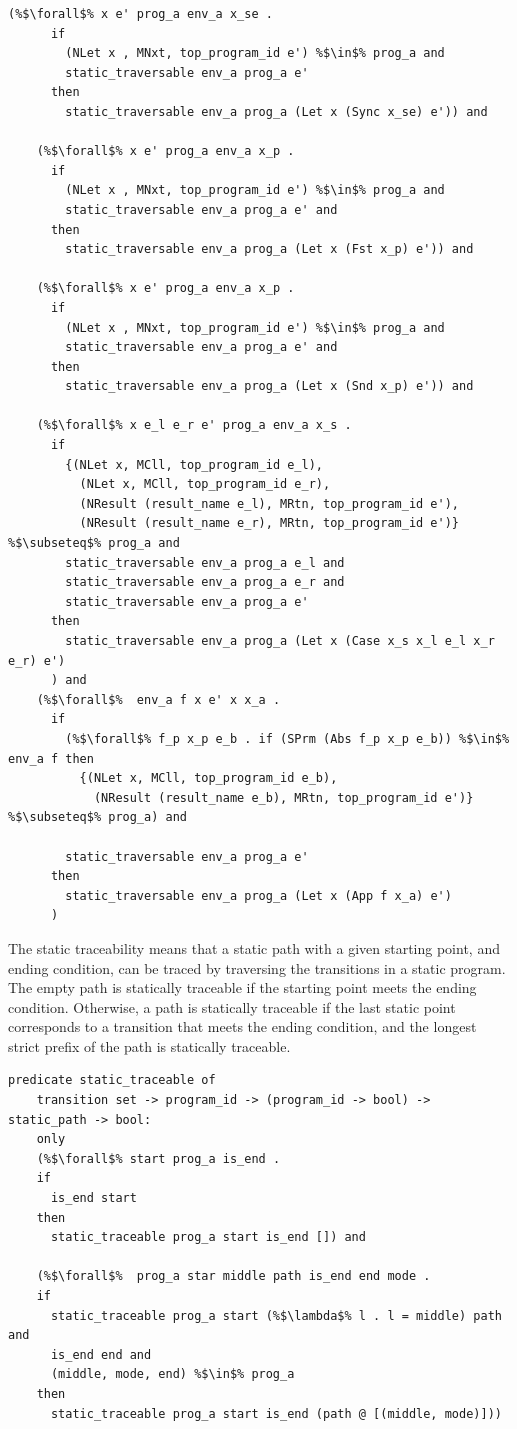 \documentclass{article}
\begin{document}
\begin{lstlisting}[language=logic, escapechar=\%]
    (%$\forall$% x e' prog_a env_a x_se .
      if
        (NLet x , MNxt, top_program_id e') %$\in$% prog_a and
        static_traversable env_a prog_a e'
      then
        static_traversable env_a prog_a (Let x (Sync x_se) e')) and

    (%$\forall$% x e' prog_a env_a x_p .
      if
        (NLet x , MNxt, top_program_id e') %$\in$% prog_a and
        static_traversable env_a prog_a e' and
      then
        static_traversable env_a prog_a (Let x (Fst x_p) e')) and

    (%$\forall$% x e' prog_a env_a x_p .
      if
        (NLet x , MNxt, top_program_id e') %$\in$% prog_a and
        static_traversable env_a prog_a e' and
      then
        static_traversable env_a prog_a (Let x (Snd x_p) e')) and

    (%$\forall$% x e_l e_r e' prog_a env_a x_s .
      if
        {(NLet x, MCll, top_program_id e_l),
          (NLet x, MCll, top_program_id e_r),
          (NResult (result_name e_l), MRtn, top_program_id e'),
          (NResult (result_name e_r), MRtn, top_program_id e')} %$\subseteq$% prog_a and
        static_traversable env_a prog_a e_l and
        static_traversable env_a prog_a e_r and
        static_traversable env_a prog_a e'
      then
        static_traversable env_a prog_a (Let x (Case x_s x_l e_l x_r e_r) e')
      ) and
    (%$\forall$%  env_a f x e' x x_a .
      if
        (%$\forall$% f_p x_p e_b . if (SPrm (Abs f_p x_p e_b)) %$\in$% env_a f then 
          {(NLet x, MCll, top_program_id e_b),
            (NResult (result_name e_b), MRtn, top_program_id e')} %$\subseteq$% prog_a) and

        static_traversable env_a prog_a e'
      then
        static_traversable env_a prog_a (Let x (App f x_a) e')
      )
  \end{lstlisting}

The static traceability means that a static path with a given starting point, and ending
condition, can be traced by traversing the transitions in a static program.
The empty path is statically traceable if the starting point meets the ending condition.
Otherwise, a path is statically traceable if the last static point corresponds to a transition
that meets the ending condition, and the longest strict prefix of the path is statically
traceable.  

\begin{lstlisting}[language=logic, escapechar=\%]
  predicate static_traceable of
    transition set -> program_id -> (program_id -> bool) -> static_path -> bool:
    only
    (%$\forall$% start prog_a is_end .
    if
      is_end start
    then
      static_traceable prog_a start is_end []) and

    (%$\forall$%  prog_a star middle path is_end end mode .
    if 
      static_traceable prog_a start (%$\lambda$% l . l = middle) path and
      is_end end and
      (middle, mode, end) %$\in$% prog_a 
    then
      static_traceable prog_a start is_end (path @ [(middle, mode)]))
  \end{lstlisting}
\end{document}
